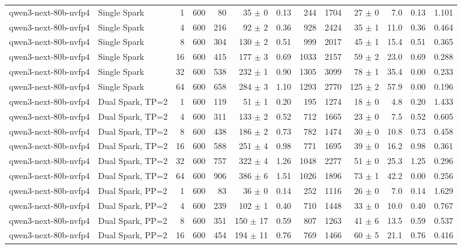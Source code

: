 \begin{tabular}{l l r r r r r r r r r r r}
\addlinespace
qwen3-next-80b-nvfp4 & Single Spark & 1 & 600 & 80\rlap{$^\dagger$} & 35 $\pm$ 0 & 0.13 & 244 & 1704 & 27 $\pm$ 0 & 7.0 & 0.13 & 1.101 \\
qwen3-next-80b-nvfp4 & Single Spark & 4 & 600 & 216 & 92 $\pm$ 2 & 0.36 & 928 & 2424 & 35 $\pm$ 1 & 11.0 & 0.36 & 0.464 \\
qwen3-next-80b-nvfp4 & Single Spark & 8 & 600 & 304 & 130 $\pm$ 2 & 0.51 & 999 & 2017 & 45 $\pm$ 1 & 15.4 & 0.51 & 0.365 \\
qwen3-next-80b-nvfp4 & Single Spark & 16 & 600 & 415 & 177 $\pm$ 3 & 0.69 & 1033 & 2157 & 59 $\pm$ 2 & 23.0 & 0.69 & 0.288 \\
qwen3-next-80b-nvfp4 & Single Spark & 32 & 600 & 538 & 232 $\pm$ 1 & 0.90 & 1305 & 3099 & 78 $\pm$ 1 & 35.4 & 0.00 & 0.233 \\
qwen3-next-80b-nvfp4 & Single Spark & 64 & 600 & 658 & 284 $\pm$ 3 & 1.10 & 1293 & 2770 & 125 $\pm$ 2 & 57.9 & 0.00 & 0.196 \\
\addlinespace
qwen3-next-80b-nvfp4 & Dual Spark, TP=2 & 1 & 600 & 119 & 51 $\pm$ 1 & 0.20 & 195 & 1274 & 18 $\pm$ 0 & 4.8 & 0.20 & 1.433 \\
qwen3-next-80b-nvfp4 & Dual Spark, TP=2 & 4 & 600 & 311 & 133 $\pm$ 2 & 0.52 & 712 & 1665 & 23 $\pm$ 0 & 7.5 & 0.52 & 0.605 \\
qwen3-next-80b-nvfp4 & Dual Spark, TP=2 & 8 & 600 & 438 & 186 $\pm$ 2 & 0.73 & 782 & 1474 & 30 $\pm$ 0 & 10.8 & 0.73 & 0.458 \\
qwen3-next-80b-nvfp4 & Dual Spark, TP=2 & 16 & 600 & 588 & 251 $\pm$ 4 & 0.98 & 771 & 1695 & 39 $\pm$ 0 & 16.2 & 0.98 & 0.361 \\
qwen3-next-80b-nvfp4 & Dual Spark, TP=2 & 32 & 600 & 757 & 322 $\pm$ 4 & 1.26 & 1048 & 2277 & 51 $\pm$ 0 & 25.3 & 1.25 & 0.296 \\
qwen3-next-80b-nvfp4 & Dual Spark, TP=2 & 64 & 600 & 906 & 386 $\pm$ 6 & 1.51 & 1026 & 1896 & 73 $\pm$ 1 & 42.2 & 0.00 & 0.256 \\
\addlinespace
qwen3-next-80b-nvfp4 & Dual Spark, PP=2 & 1 & 600 & 83\rlap{$^\dagger$} & 36 $\pm$ 0 & 0.14 & 252 & 1116 & 26 $\pm$ 0 & 7.0 & 0.14 & 1.629 \\
qwen3-next-80b-nvfp4 & Dual Spark, PP=2 & 4 & 600 & 239 & 102 $\pm$ 1 & 0.40 & 710 & 1448 & 33 $\pm$ 0 & 10.0 & 0.40 & 0.767 \\
qwen3-next-80b-nvfp4 & Dual Spark, PP=2 & 8 & 600 & 351 & 150 $\pm$ 17 & 0.59 & 807 & 1263 & 41 $\pm$ 6 & 13.5 & 0.59 & 0.537 \\
qwen3-next-80b-nvfp4 & Dual Spark, PP=2 & 16 & 600 & 454 & 194 $\pm$ 11 & 0.76 & 769 & 1466 & 60 $\pm$ 5 & 21.1 & 0.76 & 0.416 \\

\end{tabular}
